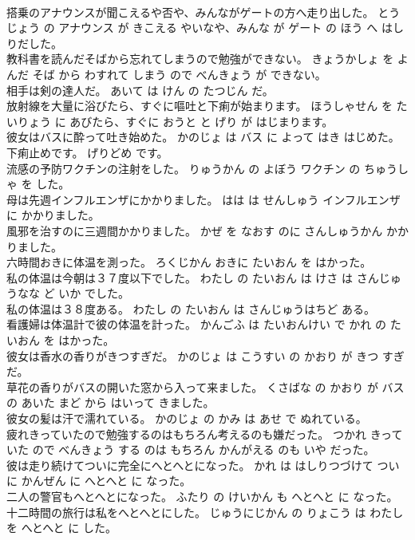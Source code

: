 \documentclass[8pt]{extreport}
\begin{document}
\begin{CJK}{UTF8}{min}
\\	搭乗のアナウンスが聞こえるや否や、みんながゲートの方へ走り出した。	とうじょう の アナウンス が きこえる やいなや、みんな が ゲート の ほう へ はしりだした。	
\\	教科書を読んだそばから忘れてしまうので勉強ができない。	きょうかしょ を よんだ そば から わすれて しまう ので べんきょう が できない。	
\\	相手は剣の達人だ。	あいて は けん の たつじん だ。	
\\	放射線を大量に浴びたら、すぐに嘔吐と下痢が始まります。	ほうしゃせん を たいりょう に あびたら、すぐに おうと と げり が はじまります。	
\\	彼女はバスに酔って吐き始めた。	かのじょ は バス に よって はき はじめた。	
\\	下痢止めです。	げりどめ です。	
\\	流感の予防ワクチンの注射をした。	りゅうかん の よぼう ワクチン の ちゅうしゃ を した。	
\\	母は先週インフルエンザにかかりました。	はは は せんしゅう インフルエンザ に かかりました。	
\\	風邪を治すのに三週間かかりました。	かぜ を なおす のに さんしゅうかん かかりました。	
\\	六時間おきに体温を測った。	ろくじかん おきに たいおん を はかった。	
\\	私の体温は今朝は３７度以下でした。	わたし の たいおん は けさ は さんじゅうなな ど いか でした。	
\\	私の体温は３８度ある。	わたし の たいおん は さんじゅうはちど ある。	
\\	看護婦は体温計で彼の体温を計った。	かんごふ は たいおんけい で かれ の たいおん を はかった。	
\\	彼女は香水の香りがきつすぎだ。	かのじょ は こうすい の かおり が きつ すぎ だ。	
\\	草花の香りがバスの開いた窓から入って来ました。	くさばな の かおり が バス の あいた まど から はいって きました。	
\\	彼女の髪は汗で濡れている。	かのじょ の かみ は あせ で ぬれている。	
\\	疲れきっていたので勉強するのはもちろん考えるのも嫌だった。	つかれ きっていた ので べんきょう する のは もちろん かんがえる のも いや だった。	
\\	彼は走り続けてついに完全にへとへとになった。	かれ は はしりつづけて ついに かんぜん に へとへと に なった。	
\\	二人の警官もへとへとになった。	ふたり の けいかん も へとへと に なった。	
\\	十二時間の旅行は私をへとへとにした。	じゅうにじかん の りょこう は わたし を へとへと に した。	

\end{CJK}
\end{document}
